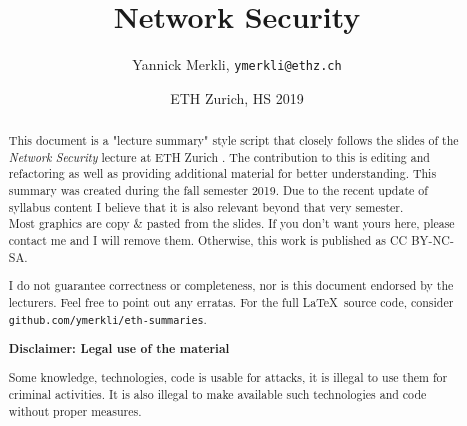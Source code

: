 \documentclass[11pt,oneside,a4paper]{article}
\title{Network Security}
\author{Yannick Merkli, \texttt{ymerkli@ethz.ch}}
\date{ETH Zurich, HS 2019}
\begin{document}
	
\begin{titlepage}
\maketitle
\vspace{3cm}
\thispagestyle{empty}


\begin{abstract}
	\noindent This document is a "lecture summary" style script that closely follows the slides of the \textit{Network Security} lecture  at ETH Zurich \cite{netsec}. The contribution to this is editing and refactoring as well as providing additional material for better understanding. This summary was created during the fall semester 2019. Due to the recent update of syllabus content I believe that it is also relevant beyond that very semester.\\
	Most graphics are copy \& pasted from the slides. If you don't want yours here, please contact me and I will remove them. Otherwise, this work is published as CC BY-NC-SA.
	
	\begin{center}
		\ccbyncsa
	\end{center}
	
	\noindent I do not guarantee correctness or completeness, nor is this document endorsed by the lecturers. Feel free to point out any erratas. For the full \LaTeX \ source code, consider \texttt{github.com/ymerkli/eth-summaries}.\\
	
	\vspace*{1cm}
	
	\centerline{\textbf{Disclaimer: Legal use of the material}}
	\vspace*{2mm}
	
	\noindent Some knowledge, technologies, code is usable for attacks, it is illegal to use them for criminal activities. It is also illegal to make available such technologies and code without proper measures.
\end{abstract}

\end{titlepage}

\maketitle
\thispagestyle{empty}
\raggedbottom
\clearpage


\clearpage
\setcounter{tocdepth}{2}
\tableofcontents
\clearpage
{}
\end{document}

